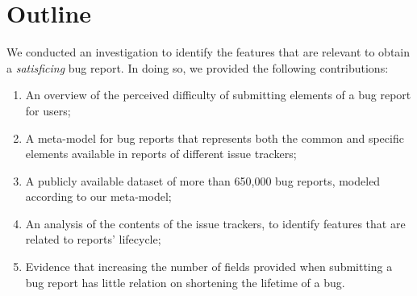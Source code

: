 %
%



\section{Outline} \label{sec:model-summary}

We conducted an investigation to identify the features that are relevant to obtain a \emph{satisficing} bug report.
In doing so, we provided the following contributions:

\begin{enumerate}

\item An overview of the perceived difficulty of submitting elements of a bug report for users;

\item A meta-model for bug reports that represents both the common and specific elements available in reports of different issue trackers;

\item A publicly available dataset of more than 650,000 bug reports, modeled according to our meta-model;

\item An analysis of the contents of the issue trackers, to identify features that are related to reports' lifecycle;

\item Evidence that increasing the number of fields provided when submitting a bug report has little relation on shortening the lifetime of a bug.

\end{enumerate}



